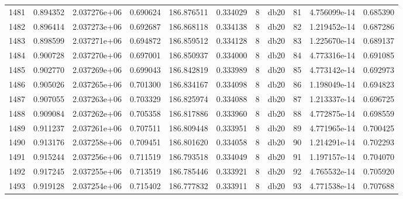 \begin{tabular}{lrrrrrrlrrr}
1481 &    0.894352 &        2.037276e+06 &  0.690624 &              186.876511 &    0.334029 &       8 &         db20 &     81 &   4.756099e-14 &      0.685390 \\
1482 &    0.896414 &        2.037273e+06 &  0.692687 &              186.868118 &    0.334138 &       8 &         db20 &     82 &   1.219452e-14 &      0.687286 \\
1483 &    0.898599 &        2.037271e+06 &  0.694872 &              186.859512 &    0.334128 &       8 &         db20 &     83 &   1.225670e-14 &      0.689137 \\
1484 &    0.900728 &        2.037270e+06 &  0.697001 &              186.850937 &    0.334000 &       8 &         db20 &     84 &   4.773316e-14 &      0.691085 \\
1485 &    0.902770 &        2.037269e+06 &  0.699043 &              186.842819 &    0.333989 &       8 &         db20 &     85 &   4.773142e-14 &      0.692973 \\
1486 &    0.905026 &        2.037265e+06 &  0.701300 &              186.834167 &    0.334098 &       8 &         db20 &     86 &   1.198049e-14 &      0.694823 \\
1487 &    0.907055 &        2.037263e+06 &  0.703329 &              186.825974 &    0.334088 &       8 &         db20 &     87 &   1.213337e-14 &      0.696725 \\
1488 &    0.909084 &        2.037262e+06 &  0.705358 &              186.817886 &    0.333960 &       8 &         db20 &     88 &   4.772875e-14 &      0.698559 \\
1489 &    0.911237 &        2.037261e+06 &  0.707511 &              186.809448 &    0.333951 &       8 &         db20 &     89 &   4.771965e-14 &      0.700425 \\
1490 &    0.913176 &        2.037258e+06 &  0.709451 &              186.801620 &    0.334058 &       8 &         db20 &     90 &   1.214291e-14 &      0.702293 \\
1491 &    0.915244 &        2.037256e+06 &  0.711519 &              186.793518 &    0.334049 &       8 &         db20 &     91 &   1.197157e-14 &      0.704070 \\
1492 &    0.917245 &        2.037255e+06 &  0.713519 &              186.785446 &    0.333921 &       8 &         db20 &     92 &   4.765532e-14 &      0.705920 \\
1493 &    0.919128 &        2.037254e+06 &  0.715402 &              186.777832 &    0.333911 &       8 &         db20 &     93 &   4.771538e-14 &      0.707688 \\

\end{tabular}
